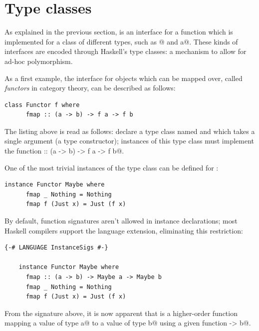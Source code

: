 \documentclass[UdineBachThesis,american,11pt]{PhdThesis}
\begin{document}
  \section{Type classes}

  As explained in the previous section, \lstinline@foldr@ is an interface for a
  function which is implemented for a class of different types, such as
  \lstinline@[a]@ and \lstinline@Maybe a@. These kinds of interfaces are encoded
  through Haskell's type classes: a mechanism to allow for ad-hoc polymorphism.

  As a first example, the interface for objects which can be mapped over, called
  \emph{functors} in category theory, can be described as follows:

  \pagebreak

  \begin{lstlisting}[gobble=4,basicstyle=\ttfamily\small]
    class Functor f where
      fmap :: (a -> b) -> f a -> f b
  \end{lstlisting}

  The listing above is read as follows: declare a type class named
  \lstinline@Functor@ and which takes a single argument \lstinline@f@ (a type
  constructor); instances of this type class must implement the function
  \lstinline@fmap :: (a -> b) -> f a -> f b@.

  One of the most trivial instances of the \lstinline@Functor@ type class can be
  defined for \lstinline@Maybe@:

  \begin{lstlisting}[gobble=4,basicstyle=\ttfamily\small]
    instance Functor Maybe where
      fmap _ Nothing = Nothing
      fmap f (Just x) = Just (f x)
  \end{lstlisting}

  By default, function signatures aren't allowed in instance declarations; most
  Haskell compilers support the \lstinline@InstanceSigs@ language extension,
  eliminating this restriction:

  \begin{lstlisting}[gobble=4,basicstyle=\ttfamily\small]
    {-# LANGUAGE InstanceSigs #-}

    instance Functor Maybe where
      fmap :: (a -> b) -> Maybe a -> Maybe b
      fmap _ Nothing = Nothing
      fmap f (Just x) = Just (f x)
  \end{lstlisting}

  From the signature above, it is now apparent that \lstinline@fmap@ is a
  higher-order function mapping a value of type \lstinline@Maybe a@ to a value
  of type \lstinline@Maybe b@ using a given function \lstinline@a -> b@.
\end{document}

